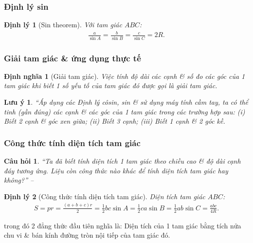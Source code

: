 \documentclass{article}
\numberwithin{equation}{section}
\newtheorem{definition}{Định nghĩa}[section]
\newtheorem{theorem}{Định lý}[section]
\newtheorem{remark}{Lưu ý}[section]
\newtheorem{question}{Câu hỏi}[section]
\begin{document}
\subsubsection{Định lý sin}

\begin{theorem}[Sin theorem]
	Với tam giác $ABC$:
	\begin{align*}
		\frac{a}{\sin A} = \frac{b}{\sin B} = \frac{c}{\sin C} = 2R. 
	\end{align*}
\end{theorem}

\subsubsection{Giải tam giác \& ứng dụng thực tế}

\begin{definition}[Giải tam giác]
	Việc tính độ dài các cạnh \& số đo các góc của 1 tam giác khi biết 1 số yếu tố của tam giác đó được gọi là \emph{giải tam giác}.
\end{definition}

\begin{remark}
	``Áp dụng các Định lý côsin, sin \& sử dụng máy tính cầm tay, ta có thể tinh (gần đúng) các cạnh \& các góc của 1 tam giác trong các trường hợp sau: (i) Biết 2 cạnh \& góc xen giữa; (ii) Biết 3 cạnh; (iii) Biết 1 cạnh \& 2 góc kề.
\end{remark}

\subsubsection{Công thức tính diện tích tam giác}

\begin{question}
	``Ta đã biết tính diện tích 1 tam giác theo chiều cao \& độ dài cạnh đáy tương ứng. Liệu còn công thức nào khác để tính diện tích tam giác hay không?'' -- \cite[p. 41]{Khoai_Anh_Tan_Thang_Anh_Cuong_Duong_Dang_Ha_Hanh_Hong_Son_Tuan_Vuong_Toan_10_tap_1}
\end{question}

\begin{theorem}[Công thức tính diện tích tam giác]
	 Diện tích tam giác $ABC$:
	 \begin{align*}
	 	S = pr = \frac{(a + b + c)r}{2} = \frac{1}{2}bc\sin A = \frac{1}{2}ca\sin B = \frac{1}{2}ab\sin C = \frac{abc}{4R}.
	 \end{align*}
\end{theorem}
trong đó 2 đẳng thức đầu tiên nghĩa là: Diện tích của 1 tam giác bằng tích nửa chu vi \& bán kính đường tròn nội tiếp của tam giác đó.
\end{document}
